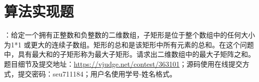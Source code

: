 \documentclass[UTF8,16pt]{article} %
\begin{document}
\vbox{} %
\vbox{} %
\section*{\textbf{算法实现题}}
：给定一个拥有正整数和负整数的二维数组，子矩形是位于整个数组中的任何大小为1*1 或更大的连续子数组。矩形的总和是该矩形中所有元素的总和。在这个问题中，具有最大和的子矩形称为最大子矩形。请求出二维数组中的最大子矩阵之和。\\
\indent 题目细节及提交地址：\url{https://vjudge.net/contest/363101}；源码使用在线提交方式，提交密码：seu711184；用户名使用学号-姓名格式。\\
\noindent
{}\\

\noindent
{}\\

\noindent
{}\\


\noindent
{}\\

\noindent
{}\\
\end{document}
